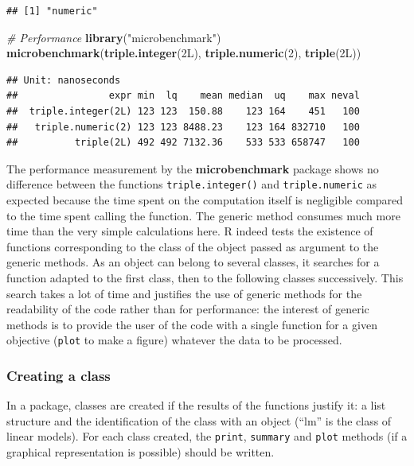 \documentclass[
  12pt,
  american,
  a4paper,
  extrafontsizes,onecolumn,openright
  ]{memoir}
\newenvironment{Shaded}{\begin{snugshade}}{\end{snugshade}}
\newcommand{\CommentTok}[1]{\textcolor[rgb]{0.56,0.35,0.01}{\textit{#1}}}
\newcommand{\DataTypeTok}[1]{\textcolor[rgb]{0.13,0.29,0.53}{#1}}
\newcommand{\DecValTok}[1]{\textcolor[rgb]{0.00,0.00,0.81}{#1}}
\newcommand{\FunctionTok}[1]{\textcolor[rgb]{0.13,0.29,0.53}{\textbf{#1}}}
\newcommand{\NormalTok}[1]{#1}
\newcommand{\StringTok}[1]{\textcolor[rgb]{0.31,0.60,0.02}{#1}}
\newlength{\rf}
\begin{document}
\begin{verbatim}
## [1] "numeric"
\end{verbatim}

\begin{Shaded}
\begin{Highlighting}[]
\CommentTok{\# Performance}
\FunctionTok{library}\NormalTok{(}\StringTok{"microbenchmark"}\NormalTok{)}
\FunctionTok{microbenchmark}\NormalTok{(}\FunctionTok{triple.integer}\NormalTok{(}\DecValTok{2}\DataTypeTok{L}\NormalTok{), }\FunctionTok{triple.numeric}\NormalTok{(}\DecValTok{2}\NormalTok{), }\FunctionTok{triple}\NormalTok{(}\DecValTok{2}\DataTypeTok{L}\NormalTok{))}
\end{Highlighting}
\end{Shaded}

\begin{verbatim}
## Unit: nanoseconds
##                expr min  lq    mean median  uq    max neval
##  triple.integer(2L) 123 123  150.88    123 164    451   100
##   triple.numeric(2) 123 123 8488.23    123 164 832710   100
##          triple(2L) 492 492 7132.36    533 533 658747   100
\end{verbatim}

\normalsize

The performance measurement by the \textbf{microbenchmark} package shows no difference between the functions \texttt{triple.integer()} and \texttt{triple.numeric} as expected because the time spent on the computation itself is negligible compared to the time spent calling the function.
The generic method consumes much more time than the very simple calculations here.
R indeed tests the existence of functions corresponding to the class of the object passed as argument to the generic methods.
As an object can belong to several classes, it searches for a function adapted to the first class, then to the following classes successively.
This search takes a lot of time and justifies the use of generic methods for the readability of the code rather than for performance: the interest of generic methods is to provide the user of the code with a single function for a given objective (\texttt{plot} to make a figure) whatever the data to be processed.

\subsubsection{Creating a class}\label{creating-a-class}

In a package, classes are created if the results of the functions justify it: a list structure and the identification of the class with an object (\enquote{lm} is the class of linear models).
For each class created, the \texttt{print}, \texttt{summary} and \texttt{plot} methods (if a graphical representation is possible) should be written.
\end{document}
